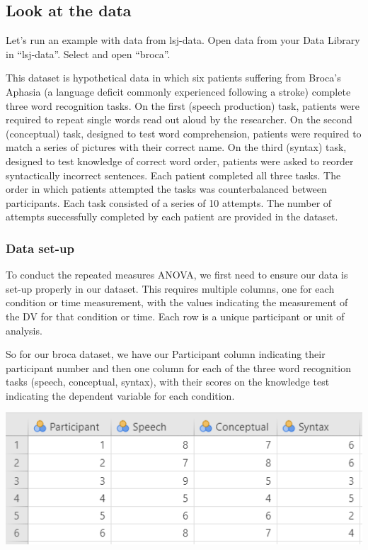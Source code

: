 \documentclass[
]{book}
\begin{document}
\hypertarget{look-at-the-data-7}{%
\subsection{Look at the data}\label{look-at-the-data-7}}

Let's run an example with data from lsj-data. Open data from your Data Library in ``lsj-data''. Select and open ``broca''.

This dataset is hypothetical data in which six patients suffering from Broca's Aphasia (a language deficit commonly experienced following a stroke) complete three word recognition tasks. On the first (speech production) task, patients were required to repeat single words read out aloud by the researcher. On the second (conceptual) task, designed to test word comprehension, patients were required to match a series of pictures with their correct name. On the third (syntax) task, designed to test knowledge of correct word order, patients were asked to reorder syntactically incorrect sentences. Each patient completed all three tasks. The order in which patients attempted the tasks was counterbalanced between participants. Each task consisted of a series of 10 attempts. The number of attempts successfully completed by each patient are provided in the dataset.

\hypertarget{data-set-up-7}{%
\subsubsection{Data set-up}\label{data-set-up-7}}

To conduct the repeated measures ANOVA, we first need to ensure our data is set-up properly in our dataset. This requires multiple columns, one for each condition or time measurement, with the values indicating the measurement of the DV for that condition or time. Each row is a unique participant or unit of analysis.

So for our broca dataset, we have our Participant column indicating their participant number and then one column for each of the three word recognition tasks (speech, conceptual, syntax), with their scores on the knowledge test indicating the dependent variable for each condition.

\includegraphics{images/05-repeated-measures-anova/rm_data.png}
\end{document}
